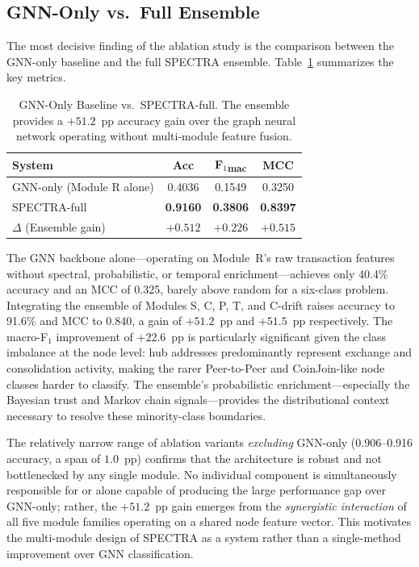 
\subsection{GNN-Only vs.\ Full Ensemble}
\label{subsec:gnn_vs_ensemble}

The most decisive finding of the ablation study is the comparison between
the GNN-only baseline and the full SPECTRA ensemble.
Table~\ref{tab:gnn_vs_full} summarizes the key metrics.

\begin{table}[t]
  \centering
  \renewcommand{\arraystretch}{1.15}
  \caption{GNN-Only Baseline vs.\ SPECTRA-full.
           The ensemble provides a $+51.2$~pp accuracy gain over the
           graph neural network operating without multi-module feature fusion.}
  \label{tab:gnn_vs_full}
  \begin{tabular}{@{}lccc@{}}
    \toprule
    \textbf{System} & \textbf{Acc} & \textbf{F$_1$\textsubscript{mac}} & \textbf{MCC} \\
    \midrule
    GNN-only (Module R alone) & 0.4036 & 0.1549 & 0.3250 \\
    SPECTRA-full              & \textbf{0.9160} & \textbf{0.3806} & \textbf{0.8397} \\
    \midrule
    $\Delta$ (Ensemble gain)  & $+0.512$ & $+0.226$ & $+0.515$ \\
    \bottomrule
  \end{tabular}
\end{table}

The GNN backbone alone—operating on Module~R's raw transaction features
without spectral, probabilistic, or temporal enrichment—achieves only
40.4\% accuracy and an MCC of 0.325, barely above random for a six-class
problem.
Integrating the ensemble of Modules S, C, P, T, and C-drift raises accuracy
to 91.6\% and MCC to 0.840, a gain of $+51.2$~pp and $+51.5$~pp
respectively.
The macro-F$_1$ improvement of $+22.6$~pp is particularly significant given
the class imbalance at the node level: hub addresses predominantly represent
exchange and consolidation activity, making the rarer Peer-to-Peer and
CoinJoin-like node classes harder to classify.
The ensemble's probabilistic enrichment—especially the Bayesian trust and
Markov chain signals—provides the distributional context necessary to
resolve these minority-class boundaries.

The relatively narrow range of ablation variants \emph{excluding} GNN-only
(0.906--0.916 accuracy, a span of $1.0$~pp) confirms that the architecture
is robust and not bottlenecked by any single module.
No individual component is simultaneously responsible for or alone capable
of producing the large performance gap over GNN-only; rather, the $+51.2$~pp
gain emerges from the \emph{synergistic interaction} of all five module
families operating on a shared node feature vector.
This motivates the multi-module design of SPECTRA as a system rather than a
single-method improvement over GNN classification.

%
